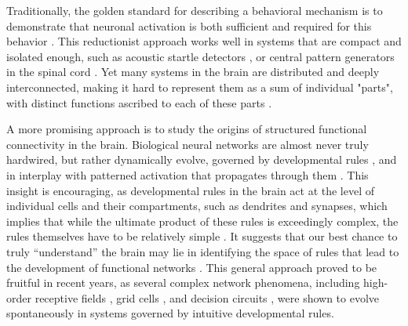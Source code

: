 \documentclass{article}
\begin{document}
Traditionally, the golden standard for describing a behavioral mechanism is to demonstrate that neuronal activation is both sufficient and required for this behavior \citep{krakauer2017reductionist}. This reductionist approach works well in systems that are compact and isolated enough, such as acoustic startle detectors \citep{korn2005mauthner}, or central pattern generators in the spinal cord \citep{roberts2010hatchling}. Yet many systems in the brain are distributed and deeply interconnected, making it hard to represent them as a sum of individual "parts", with distinct functions ascribed to each of these parts \citep{gao2015simplicity}. %

A more promising approach is to study the origins of structured functional connectivity in the brain. Biological neural networks are almost never truly hardwired, but rather dynamically evolve, governed by developmental rules \citep{pietri2017emergence}, and in interplay with patterned activation that propagates through them \citep{gao2015simplicity}. This insight is encouraging, as developmental rules in the brain act at the level of individual cells and their compartments, such as dendrites and synapses, which implies that while the ultimate product of these rules is exceedingly complex, the rules themselves have to be relatively simple \citep{bassett2018models}. It suggests that our best chance to truly “understand” the brain may lie in identifying the space of rules that lead to the development of functional networks \citep{linderman2017constrain}. This general approach proved to be fruitful in recent years, as several complex network phenomena, including high-order receptive fields \citep{bashivan2018neural}, grid cells \citep{banino2018grid}, and decision circuits \citep{haesemeyer2018convergent}, were shown to evolve spontaneously in systems governed by intuitive developmental rules. 
\end{document}
